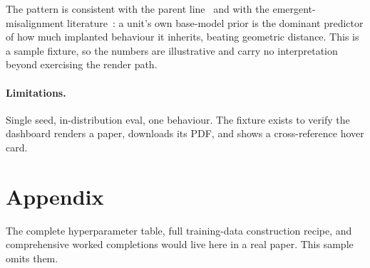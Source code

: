 \documentclass[11pt]{article}
\begin{document}
The pattern is consistent with the parent line~ and with the
emergent-misalignment literature~\citep{betley2025emergent}: a unit's own
base-model prior is the dominant predictor of how much implanted behaviour it
inherits, beating geometric distance. This is a sample fixture, so the numbers
are illustrative and carry no interpretation beyond exercising the render path.

\paragraph{Limitations.} Single seed, in-distribution eval, one behaviour. The
fixture exists to verify the dashboard renders a paper, downloads its PDF, and
shows a cross-reference hover card.




\appendix
\section{Appendix}
\label{sec:appendix}

The complete hyperparameter table, full training-data construction recipe, and
comprehensive worked completions would live here in a real paper. This sample
omits them.
\end{document}
